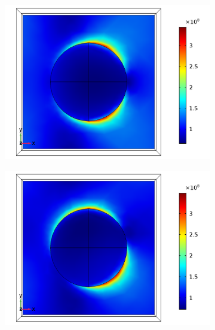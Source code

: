 \begin{figure}[htb!]  
    \begin{subfigure}{0.32\textwidth}    %
        \centering
        \includegraphics[width=\linewidth]{figures/ch4/S5A/FieldDistribution/phi0-90/Sample5A_TE_Slice@z=0_wl=350_phi=0.png}
   \end{subfigure}
   \begin{subfigure}{0.32\textwidth}
        \centering
        \includegraphics[width=\linewidth]{figures/ch4/S5A/FieldDistribution/phi0-90/Sample5A_TE_Slice@z=0_wl=350_phi=25.png}
   \end{subfigure}
   \begin{subfigure}{0.32\textwidth}

\end{subfigure}
\end{figure}
